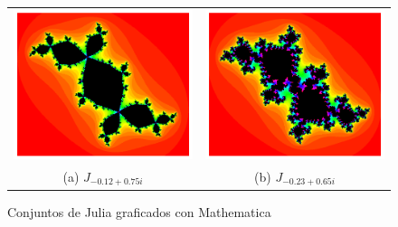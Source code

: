 \begin{figure}[ht]
  \centering
  \begin{tabular}{cc}
    \includegraphics[scale=0.5]{./img/C3/julia-explicado-1.png} &   \includegraphics[scale=0.5]{./img/C3/julia-explicado-2.png} \\
  (a) $J_{-0.12+0.75i}$ & (b) $J_{-0.23+0.65i}$  \\[6pt]
  \end{tabular}
  \caption{Conjuntos de Julia graficados con Mathematica}
  \label{fig:julia-explicados}
\end{figure}

